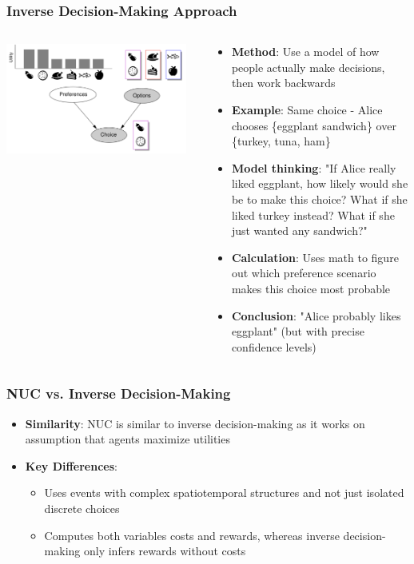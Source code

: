 \documentclass{beamer}
\begin{document}
\begin{frame}
\frametitle{Inverse Decision-Making Approach}
\begin{columns}
\begin{column}{0.5\textwidth}
\begin{center}
\includegraphics[width=0.95\textwidth]{inverse_decision.png}
\end{center}
\end{column}
\begin{column}{0.5\textwidth}
\begin{itemize}
    \item \textbf{Method}: Use a model of how people actually make decisions, then work backwards
    \item \textbf{Example}: Same choice - Alice chooses \{eggplant sandwich\} over \{turkey, tuna, ham\}
    \item \textbf{Model thinking}: "If Alice really liked eggplant, how likely would she be to make this choice? What if she liked turkey instead? What if she just wanted any sandwich?"
    \item \textbf{Calculation}: Uses math to figure out which preference scenario makes this choice most probable
    \item \textbf{Conclusion}: "Alice probably likes eggplant" (but with precise confidence levels)
\end{itemize}
\end{column}
\end{columns}
\end{frame}

\begin{frame}
\frametitle{NUC vs. Inverse Decision-Making}
\begin{itemize}
    \item \textbf{Similarity}: NUC is similar to inverse decision-making as it works on assumption that agents maximize utilities
    \item \textbf{Key Differences}:
    \begin{itemize}
        \item Uses events with complex spatiotemporal structures and not just isolated discrete choices
        \item Computes both variables costs and rewards, whereas inverse decision-making only infers rewards without costs
    \end{itemize}
\end{itemize}
\end{frame}
\end{document}
